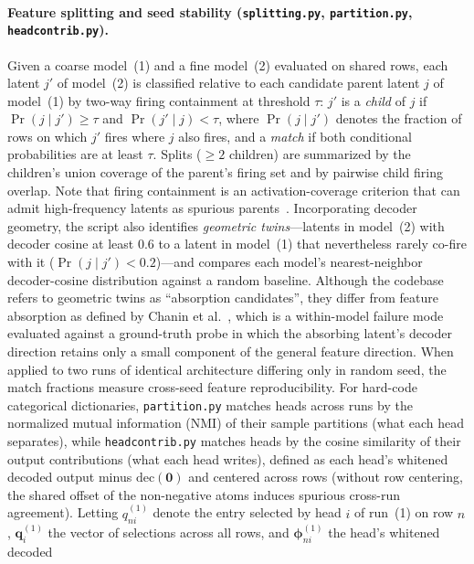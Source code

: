 \paragraph{Feature splitting and seed stability (\texttt{splitting.py},
\texttt{partition.py}, \texttt{headcontrib.py}).}
Given a coarse model~(1) and a fine model~(2) evaluated on shared rows,
each latent $j'$ of model~(2) is classified relative to each candidate
parent latent $j$ of model~(1) by two-way firing containment at threshold
$\tau$: $j'$ is a \emph{child} of $j$ if $\Pr(j \mid j') \geq \tau$ and
$\Pr(j' \mid j) < \tau$, where $\Pr(j \mid j')$ denotes the fraction of
rows on which $j'$ fires where $j$ also fires, and a \emph{match} if both
conditional probabilities are at least $\tau$. Splits ($\geq 2$ children)
are summarized by the children's union coverage of the parent's firing set
and by pairwise child firing overlap. Note that firing containment is an
activation-coverage criterion that can admit high-frequency latents as
spurious parents~\cite{cao2026}. Incorporating decoder geometry, the script
also identifies \emph{geometric twins}---latents in model~(2) with decoder
cosine at least $0.6$ to a latent in model~(1) that nevertheless rarely
co-fire with it ($\Pr(j \mid j') < 0.2$)---and compares each model's
nearest-neighbor decoder-cosine distribution against a random baseline.
Although the codebase refers to geometric twins as ``absorption
candidates'', they differ from feature absorption as defined by Chanin
et al.~\cite{chanin2025}, which is a within-model failure mode evaluated
against a ground-truth probe in which the absorbing latent's decoder
direction retains only a small component of the general feature direction.
When applied to two runs of identical architecture differing only in random
seed, the match fractions measure cross-seed feature reproducibility. For
hard-code categorical dictionaries, \texttt{partition.py} matches heads
across runs by the normalized mutual information (NMI) of their sample
partitions (what each head separates), while \texttt{headcontrib.py}
matches heads by the
cosine similarity of their output contributions (what each head writes),
defined as each head's whitened decoded output minus
$\mathrm{dec}(\mathbf{0})$ and centered across rows (without row centering,
the shared offset of the non-negative atoms induces spurious cross-run
agreement). Letting $q^{(1)}_{ni}$ denote the entry selected by head $i$ of
run~(1) on row $n$, $\mathbf{q}^{(1)}_i$ the vector of selections across
all rows, and $\boldsymbol{\phi}^{(1)}_{ni}$ the head's whitened decoded

